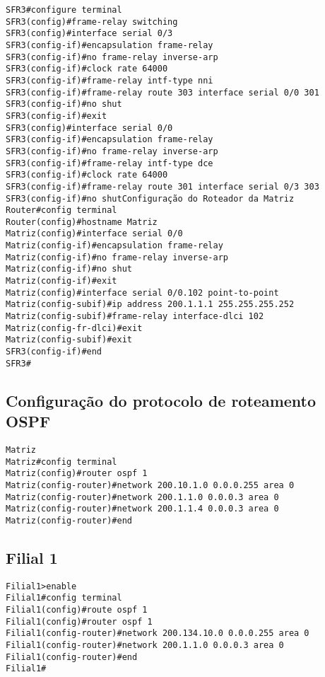 \documentclass[]{article}
\begin{document}
\begin{verbatim}
SFR3#configure terminal
SFR3(config)#frame-relay switching
SFR3(config)#interface serial 0/3
SFR3(config-if)#encapsulation frame-relay
SFR3(config-if)#no frame-relay inverse-arp
SFR3(config-if)#clock rate 64000
SFR3(config-if)#frame-relay intf-type nni
SFR3(config-if)#frame-relay route 303 interface serial 0/0 301
SFR3(config-if)#no shut
SFR3(config-if)#exit
SFR3(config)#interface serial 0/0
SFR3(config-if)#encapsulation frame-relay
SFR3(config-if)#no frame-relay inverse-arp
SFR3(config-if)#frame-relay intf-type dce
SFR3(config-if)#clock rate 64000
SFR3(config-if)#frame-relay route 301 interface serial 0/3 303
SFR3(config-if)#no shutConfiguração do Roteador da Matriz
Router#config terminal
Router(config)#hostname Matriz
Matriz(config)#interface serial 0/0
Matriz(config-if)#encapsulation frame-relay
Matriz(config-if)#no frame-relay inverse-arp
Matriz(config-if)#no shut
Matriz(config-if)#exit
Matriz(config)#interface serial 0/0.102 point-to-point
Matriz(config-subif)#ip address 200.1.1.1 255.255.255.252
Matriz(config-subif)#frame-relay interface-dlci 102
Matriz(config-fr-dlci)#exit
Matriz(config-subif)#exit
SFR3(config-if)#end
SFR3#
\end{verbatim}

\subsection{Configuração do protocolo de roteamento
OSPF}\label{configurauxe7uxe3o-do-protocolo-de-roteamento-ospf}

\begin{verbatim}
Matriz
Matriz#config terminal
Matriz(config)#router ospf 1
Matriz(config-router)#network 200.10.1.0 0.0.0.255 area 0
Matriz(config-router)#network 200.1.1.0 0.0.0.3 area 0
Matriz(config-router)#network 200.1.1.4 0.0.0.3 area 0
Matriz(config-router)#end
\end{verbatim}

\subsection{Filial 1}\label{filial-1}

\begin{verbatim}
Filial1>enable
Filial1#config terminal
Filial1(config)#route ospf 1
Filial1(config)#router ospf 1
Filial1(config-router)#network 200.134.10.0 0.0.0.255 area 0
Filial1(config-router)#network 200.1.1.0 0.0.0.3 area 0
Filial1(config-router)#end
Filial1#
\end{verbatim}
\end{document}
